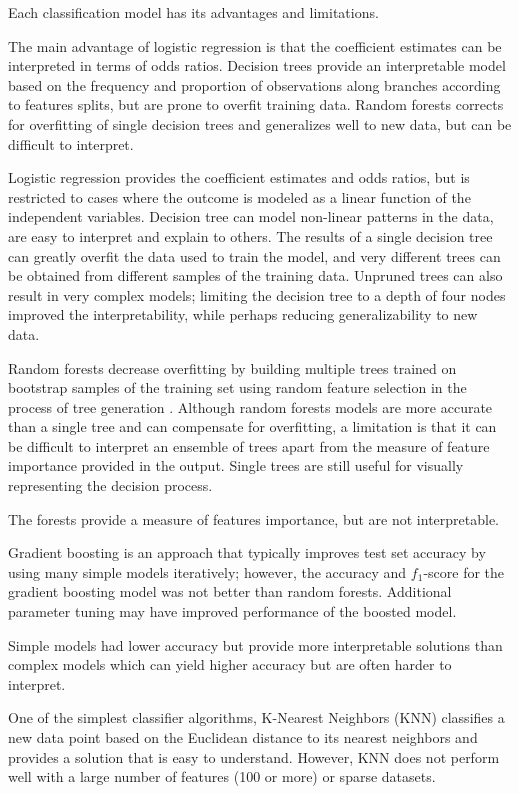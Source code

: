 \documentclass[sigconf]{acmart}
\begin{document}
Each classification model has its advantages and limitations. 

The main advantage of logistic regression is that 
the coefficient estimates can be interpreted in terms of odds ratios. 
Decision trees provide an interpretable model based on the frequency
and proportion of observations along branches according to features splits, 
but are prone to overfit training data. Random forests corrects for 
overfitting of single decision trees and generalizes well to new data, 
but can be difficult to interpret. 

Logistic 
regression provides the coefficient estimates and odds ratios, but is 
restricted to cases where the outcome is modeled as a linear function of 
the independent variables. Decision tree can model non-linear patterns in 
the data, are easy to interpret and explain to others. The results of a 
single decision tree can greatly overfit the data used to train the model, 
and very different trees can be obtained from different samples of the 
training data. Unpruned trees can also result in very complex models; 
limiting the decision tree to a depth of four nodes improved the 
interpretability, while perhaps reducing generalizability to new data. 

Random forests decrease overfitting by building multiple trees trained on
bootstrap samples of the training set using random feature selection in the
process of tree generation \cite{brown12}. Although random forests models are
more accurate than a single tree and can compensate for overfitting, a 
limitation is that it can be difficult to interpret an ensemble of trees apart 
from the measure of feature importance provided in the output. Single trees 
are still useful for visually representing the decision process.

The forests provide a measure of features importance, but are not interpretable.

Gradient boosting is an approach that typically improves test set accuracy by 
using many simple models iteratively; however, the accuracy and $f_1$-score for 
the gradient boosting model was not better than random forests. Additional 
parameter tuning may have improved performance of the boosted model.


Simple models had lower accuracy but provide more interpretable solutions 
than complex models which can yield higher accuracy but are often harder 
to interpret. 

One of the simplest classifier algorithms, K-Nearest Neighbors (KNN)
classifies a new data point based on the Euclidean distance to its 
nearest neighbors and provides a solution that is easy to understand. 
However, KNN does not perform well with a large number of features 
(100 or more) or sparse datasets.
\end{document}
